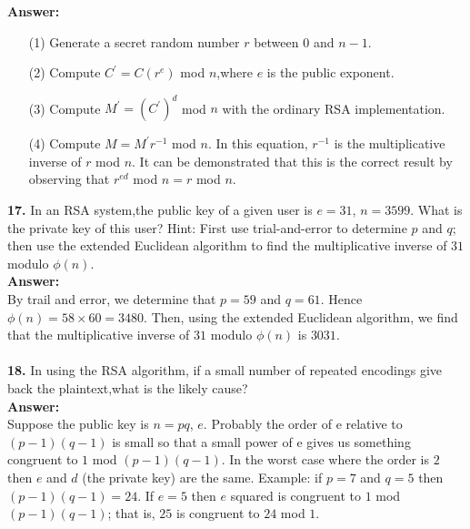 \documentclass[paper=a4, fontsize=11pt]{scrartcl} %
\numberwithin{equation}{section} %
\numberwithin{figure}{section} %
\numberwithin{table}{section} %
\begin{document}
 \textbf{Answer:}

 \begin{enumerate}
 \item[(1)] Generate a secret random number $r$ between $0$ and $n - 1$.
 \item[(2)] Compute $C^{'}= C(r^{e} )$ mod $n$,where $e$ is the public exponent.
 \item[(3)] Compute $M^{'} = (C^{'})^{d}$ mod $n$ with the ordinary RSA implementation.
 \item[(4)] Compute $M = M^{'} r^{-1}$ mod $n$. In this equation, $r^{-1}$ is the multiplicative inverse of $r$ mod $n$. It can be demonstrated that this is the correct result by observing that $r^{ed}$ mod $n = r$ mod $n$.\\
 \end{enumerate}




 \textbf{17.} In an RSA system,the public key of a given user is $e = 31$, $n = 3599$. What is the private key of this user? Hint: First use trial-and-error to determine $p$ and $q$; then use the extended Euclidean algorithm to find the multiplicative inverse of $31$ modulo $\phi(n)$.\\

 \textbf{Answer:}\\

 By trail and error, we determine that $p = 59$ and $q = 61$. Hence $\phi(n) = 58 \times 60 = 3480$. Then, using the extended Euclidean algorithm, we find that the multiplicative inverse of $31$ modulo $\phi(n)$ is $3031$.\\ \\



 \textbf{18.} In using the RSA algorithm, if a small number of repeated encodings give back the plaintext,what is the likely cause?\\

 \textbf{Answer:}\\
 
 Suppose the public key is $n = pq$, $e$. Probably the order of e relative to $(p-1)(q-1)$ is small so that a small power of e gives us something congruent to $1$ mod $(p-1)(q-1)$. In the worst case where the order is $2$ then $e$ and $d$ (the private key) are the same. Example: if $p = 7$ and $q = 5$ then $(p-1)(q-1) = 24$. If $e = 5$ then $e$ squared is congruent to $1$ mod $(p-1)(q-1)$; that is, $25$ is congruent to $24$ mod $1$.\\ \\
\end{document}
